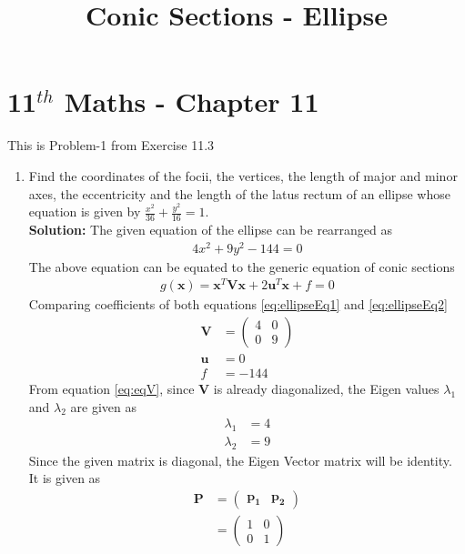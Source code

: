 \documentclass[12pt]{article}
\providecommand{\brak}[1]{\ensuremath{\left(#1\right)}}
\newcommand{\solution}{\noindent \textbf{Solution: }}
\newcommand{\myvec}[1]{\ensuremath{\begin{pmatrix}#1\end{pmatrix}}}
\let\vec\mathbf
\begin{document}
\begin{center}
\title{\textbf{Conic Sections - Ellipse}}
\date{\vspace{-5ex}} %
\maketitle
\end{center}
\setcounter{page}{1}

\section{11$^{th}$ Maths - Chapter 11}
This is Problem-1 from Exercise 11.3
\begin{enumerate}
	\item Find the coordinates of the focii, the vertices, the length of major and minor axes, the eccentricity and the length of the latus rectum of an ellipse whose equation is given by $\frac{x^2}{36}+\frac{y^2}{16} = 1$. \\ 
\solution 
The given equation of the ellipse can be rearranged as
\begin{align}
    \label{eq:ellipseEq1}
    4x^2 + 9y^2-144 = 0
\end{align}
The above equation can be equated to the generic equation of conic sections
\begin{align}
	\label{eq:ellipseEq2}
	g\brak{\vec{x}} = \vec{x}^T\vec{V}\vec{x} + 2\vec{u}^T\vec{x} + f = 0 
\end{align}
Comparing coefficients of both equations \eqref{eq:ellipseEq1} and \eqref{eq:ellipseEq2} 
\begin{align}
	\label{eq:eqV}
	\vec{V} &= \myvec{ 4 & 0 \\ 0 & 9} \\
	\label{eq:eqU}
	\vec{u} &=  0 \\
	\label{eq:eqF}
	f &= -144 
\end{align}
From equation \eqref{eq:eqV}, since $\vec{V}$ is already diagonalized, the Eigen values $\lambda_1$ and $\lambda_2$ are given as 
\begin{align}
	\label{eq:eqEigen1}
	\lambda_1 &= 4 \\
	\label{eq:eqEigen2}
	\lambda_2 &= 9 
\end{align}
Since the given matrix is diagonal, the Eigen Vector matrix will be identity. It is given as
\begin{align}
	\vec{P} &= \myvec{ \vec{p_1} & \vec{p_2}} \\
	&= \myvec{ 1 & 0 \\ 0 & 1}
\end{align}


\end{enumerate}
\end{document}
